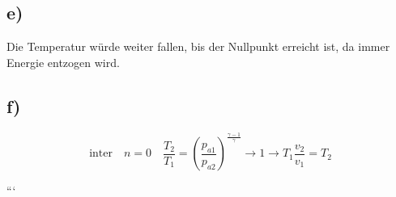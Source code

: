 

\subsection*{e)}

Die Temperatur würde weiter fallen, bis der Nullpunkt erreicht ist, da immer Energie entzogen wird.

\subsection*{f)}

\begin{equation*}
    \text{inter} \quad n = 0 \quad \frac{T_2}{T_1} = \left( \frac{p_{a1}}{p_{a2}} \right)^{\frac{\gamma - 1}{\gamma}} \rightarrow 1 \rightarrow T_1 \frac{v_2}{v_1} = T_2
\end{equation*}

```